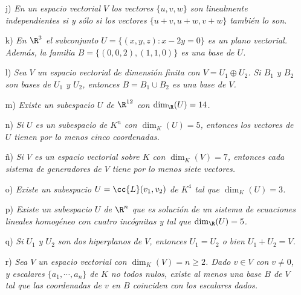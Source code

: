 \begin{ejercicio}
\begin{enumerate}
		\item[j)] \textit{En un espacio vectorial \( V \) los vectores \( \{u,v,w\} \) son linealmente independientes si y sólo si los vectores \( \{u+v,u+w,v+w\} \) también lo son.}
		\item[k)] \textit{En \( \R^3 \) el subconjunto \( U = \{(x,y,z): x-2y=0\} \) es un plano vectorial. Además, la familia \( B = \{(0,0,2),(1,1,0)\} \) es una base de \( U \).}
		\item[l)] \textit{Sea \( V \) un espacio vectorial de dimensión finita con \( V = U_1 \oplus U_2 \). Si \( B_1 \) y \( B_2 \) son bases de \( U_1 \) y \( U_2 \), entonces \( B = B_1 \cup B_2 \) es una base de \( V \).}
		\item[m)] \textit{Existe un subespacio \( U \) de \( \R^{12} \) con \( \dim_{\R}(U) = 14 \).}
		\item[n)] \textit{Si \( U \) es un subespacio de \( K^n \) con \( \dim_K(U) = 5 \), entonces los vectores de \( U \) tienen por lo menos cinco coordenadas.}
		\item[ñ)] \textit{Si \( V \) es un espacio vectorial sobre \( K \) con \( \dim_K(V) = 7 \), entonces cada sistema de generadores de \( V \) tiene por lo menos siete vectores.}
		\item[o)] \textit{Existe un subespacio \( U = \cc{L}(v_1, v_2) \) de \( K^4 \) tal que \( \dim_K(U) = 3 \).}
		\item[p)] \textit{Existe un subespacio \( U \) de \( \R^n \) que es solución de un sistema de ecuaciones lineales homogéneo con cuatro incógnitas y tal que \( \dim_{\R}(U) = 5 \).}
		\item[q)] \textit{Si \( U_1 \) y \( U_2 \) son dos hiperplanos de \( V \), entonces \( U_1 = U_2 \) o bien \( U_1 + U_2 = V \).}
		\item[r)] \textit{Sea \( V \) un espacio vectorial con \( \dim_K(V) = n \geq 2 \). Dado \( v \in V \) con \( v \neq 0 \), y escalares \( \{a_1, \cdots, a_n\} \) de \( K \) no todos nulos, existe al menos una base \( B \) de \( V \) tal que las coordenadas de \( v \) en \( B \) coinciden con los escalares dados.}
	\end{enumerate}
\end{ejercicio}

